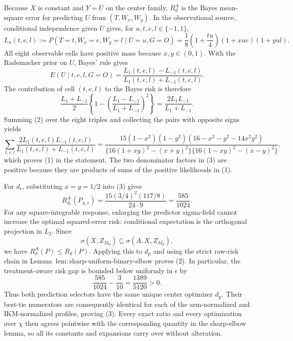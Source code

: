 Because \(X\) is constant and \(Y=U\) on the center family, \(R_d^A\) is the Bayes mean-square error for predicting \(U\) from \((T,W_x,W_y)\). In the observational source, conditional independence given \(U\) gives, for \(u,t,e,l\in\{-1,1\}\),
\[
 L_u(t,e,l):=P(T=t,W_x=e,W_y=l\mid U=u,G=O)
 =\frac18\left(1+\frac{tu}{4}\right)(1+xue)(1+yul). \tag{1}
\]
All eight observable cells have positive mass because \(x,y\in(0,1)\). With the Rademacher prior on \(U\), Bayes' rule gives
\[
 E(U\mid t,e,l,G=O)=\frac{L_1(t,e,l)-L_{-1}(t,e,l)}
 {L_1(t,e,l)+L_{-1}(t,e,l)}.
\]
The contribution of cell \((t,e,l)\) to the Bayes risk is therefore
\[
 \frac{L_1+L_{-1}}2
 \left\{1-\left(\frac{L_1-L_{-1}}{L_1+L_{-1}}\right)^2\right\}
 =\frac{2L_1L_{-1}}{L_1+L_{-1}}. \tag{2}
\]
Summing (2) over the eight triples and collecting the pairs with opposite signs yields
\[
 \sum_{t,e,l}\frac{2L_1(t,e,l)L_{-1}(t,e,l)}
 {L_1(t,e,l)+L_{-1}(t,e,l)}
 =\frac{15(1-x^2)(1-y^2)(16-x^2-y^2-14x^2y^2)}
 {\{16(1+xy)^2-(x+y)^2\}\{16(1-xy)^2-(x-y)^2\}}, \tag{3}
\]
which proves (1) in the statement. The two denominator factors in (3) are positive because they are products of sums of the positive likelihoods in (1).

For \(d_{\mathrm e}\), substituting \(x=y=1/2\) into (3) gives
\[
 R_{d_{\mathrm e}}^A(P_{\chi,\epsilon})
 =\frac{15(3/4)^2(117/8)}{24\cdot9}
 =\frac{585}{1024}. \tag{4}
\]
For any square-integrable response, enlarging the predictor sigma-field cannot increase the optimal squared-error risk: conditional expectation is the orthogonal projection in \(L_2\). Since
\[
 \sigma(X,Z_{M_d})\subseteq\sigma(A,X,Z_{M_d}),
\]
we have \(R_d^A(P)\le R_d(P)\). Applying this to \(d_{\mathrm p}\) and using the strict raw-risk chain in Lemma~\(\mathrm{lem{:}sharp\text{-}uniform\text{-}binary\text{-}elbow}\) proves (2). In particular, the treatment-aware risk gap is bounded below uniformly in \(\epsilon\) by
\[
 \frac{585}{1024}-\frac3{10}=\frac{1389}{5120}>0. \tag{5}
\]
Thus both prediction selectors have the same unique center optimizer \(d_{\mathrm p}\). Their best-tie numerators are consequently identical for each of the arm-normalized and IKM-normalized profiles, proving (3). Every exact ratio and every optimization over \(\chi\) then agrees pointwise with the corresponding quantity in the sharp-elbow lemma, so all its constants and expansions carry over without alteration.